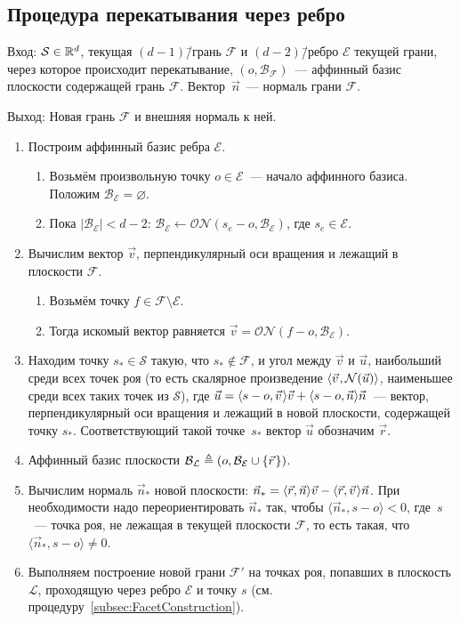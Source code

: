 \documentclass[a4paper,12pt]{article}
\newcommand{\R}[1][]{%
  \ifthenelse{\equal{#1}{}}%
  {\mathbb{R}}%
  {\mathbb{R}^{#1}}}
\newcommand{\Swarm}{\mathcal{S}}              %
\newcommand{\Facet}{\mathcal{F}}              %
\newcommand{\Edge}{\mathcal{E}}               %
\newcommand{\Basis}{\mathcal{B}}              %
\newcommand{\set}[2][]{#1\{ #2 #1\}}                    %
\newcommand{\scalprod}[3][]{#1\langle #2, #3 #1\rangle} %
\newcommand{\Norm}[2][]{\mathcal{N}#1( #2 #1)} %
\newcommand{\ONorm}[3][]{\mathcal{ON}#1( #2, #3 #1)} %
\newcommand{\Plane}{\mathcal{L}}           %
\renewcommand{\.}{\hspace{0.2ex}}
\begin{document}
  \subsection{Процедура перекатывания через ребро}
    Вход: $\Swarm \in \R[d]$, текущая $(d-1)$\=/грань $\Facet$ и $(d-2)$\=/ребро $\Edge$ текущей грани, через которое происходит перекатывание, $(o, \Basis_{\Facet})$~--- аффинный базис плоскости содержащей грань $\Facet$. Вектор~$\vec n$~--- нормаль грани $\Facet$.

    Выход: Новая грань $\Facet$ и внешняя нормаль к ней.

    \begin{enumerate}
      \item Построим аффинный базис ребра $\Edge$.
      \begin{enumerate}
        \item Возьмём произвольную точку $o \in \Edge$~--- начало аффинного базиса. Положим $\Basis_\Edge = \varnothing$.

        \item Пока $|\Basis_\Edge| < d-2$: $\Basis_\Edge \leftarrow \ONorm{s_e - o}{\Basis_\Edge}$, где $s_e \in \Edge$.
      \end{enumerate}

      \item Вычислим вектор $\vec v$, перпендикулярный оси вращения и лежащий в плоскости $\Facet$.
      \begin{enumerate}
        \item Возьмём точку $f \in \Facet \setminus \Edge$.
        \item Тогда искомый вектор равняется $\vec v = \ONorm{f - o}{\Basis_\Edge}$.
      \end{enumerate}

      \item Находим точку $s_* \in \Swarm$ такую, что $s_* \notin \Facet$, и угол между $\vec v$ и $\vec u$, наибольший среди всех точек роя (то есть скалярное произведение $\scalprod{\vec v \.}{\Norm{\vec u}}$, наименьшее среди всех таких точек из $\Swarm$), где $\vec u = \scalprod{s - o}{\vec v \.}\vec v + \scalprod{s - o}{\vec n}\vec n$~--- вектор, перпендикулярный оси вращения и лежащий в новой плоскости, содержащей точку $s_*$. Соответствующий такой точке~$s_*$ вектор $\vec u$ обозначим $\vec r$.

      \item Аффинный базис плоскости $\Basis_\Plane \triangleq (o, \Basis_\Edge \cup \set{\vec r \.})$.

      \item Вычислим нормаль $\vec n_{*}$ новой плоскости: $\vec n_{*} = \scalprod{\vec r}{\vec n}\vec v - \scalprod{\vec r}{\vec v \.}\vec n$. При необходимости надо переориентировать $\vec n_{*}$ так, чтобы $\scalprod{\vec n_{*}}{s - o} < 0$, где~$s$~--- точка роя, не лежащая в текущей плоскости $\Facet$, то есть такая, что $\scalprod{\vec n_{*}}{s - o} \neq 0$.

      \item Выполняем построение новой грани $\Facet'$ на точках роя, попавших в плоскость $\Plane$, проходящую через ребро $\Edge$ и точку $s$ (см. процедуру~\ref{subsec:FacetConstruction}).
    \end{enumerate}
\end{document}
